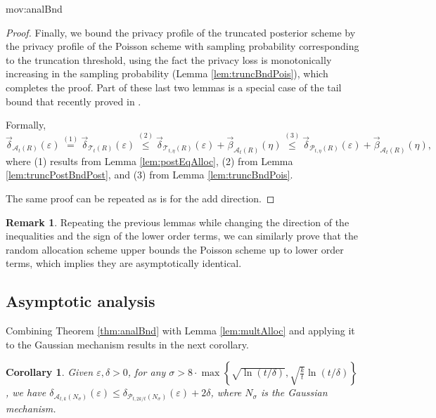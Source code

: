 \documentclass{article}
\newcommand{\arxvFtnt}[1]{}
\newcommand{\mainThmAsym}{thm:analBnd}
\newcommand{\arxvFtnt}[1]{\footnote{#1}}
\newcommand{\mainThmAsym}{thm:asymBnd}
\theoremstyle{plain}
\newtheorem{corollary}[theorem]{Corollary}
\theoremstyle{definition}
\newtheorem{remark}[theorem]{Remark}
\newcommand{\eps}{\varepsilon}
\newcommand{\eqExp}[2]{\overset{(#1)}{#2}}
\newcommand{\rand}{R}
\newcommand{\Pois}[2]{\mathcal{P}_{#1}\left(#2\right)}
\newcommand{\alloc}[2]{\mathcal{A}_{#1}\left(#2\right)}
\newcommand{\post}[2]{\mathcal{T}_{#1}\left(#2\right)}
\newcommand{\rem}[1]{\vec{#1}}
\newcommand{\privProf}[1]{\delta_{#1}}
\newcommand{\privProfRem}[1]{\rem{\delta}_{#1}}
\begin{document}
\begin{movable}{mov:analBnd}{}
\begin{proof}
    Finally, we bound the privacy profile of the truncated posterior scheme by the privacy profile of the Poisson scheme with sampling probability corresponding to the truncation threshold, using the fact the privacy loss is monotonically increasing in the sampling probability (Lemma \ref{lem:truncBndPois}), which completes the proof. Part of these last two lemmas is a special case of the tail bound that recently proved in \citep[Theorem 3.1]{CCGST23}.

    Formally,
    \[
        \privProfRem{\alloc{t}{\rand}}(\eps) \eqExp{1}{=} \privProfRem{\post{t}{\rand}}(\eps) \eqExp{2}{\le} \privProfRem{\post{t, \eta}{\rand}}(\eps) + \rem{\beta}_{\alloc{t}{\rand}}(\eta) \eqExp{3}{\le} \privProfRem{\Pois{t, \eta}{\rand}}(\eps) + \rem{\beta}_{\alloc{t}{\rand}}(\eta),
    \]
	where (1) results from Lemma \ref{lem:postEqAlloc}, (2) from Lemma \ref{lem:truncPostBndPost}, and (3) from Lemma \ref{lem:truncBndPois}.

    The same proof can be repeated as is for the add direction. 
\end{proof}

\begin{remark}
    Repeating the previous lemmas while changing the direction of the inequalities and the sign of the lower order terms, we can similarly prove that the random allocation scheme upper bounds the Poisson scheme up to lower order terms, which implies they are asymptotically identical.
\end{remark}    
\end{movable}

\subsection{ Asymptotic analysis}\label{sec:asym}
Combining Theorem \ref{\mainThmAsym} with Lemma \ref{lem:multAlloc} and applying it to the Gaussian mechanism results in the next corollary.\arxvFtnt{Extending Lemma \ref{lem:analBnd} and Theorem \ref{thm:asymBnd} to directly account for allocation of $k$ steps might improve some lower order terms, but requires a more involved version of Lemma \ref{lem:truncPostBndPost}, specifically Claim \ref{clm:postProbEqLoss} on which its proof relies. We leave this for future work.}

\begin{corollary} \label{cor:GaussAnalBnd}
    Given $\eps, \delta > 0$, for any $\sigma > 8 \cdot \max \left\{\sqrt{\ln(t/\delta)}, \sqrt{\frac{k}{t}} \ln(t/\delta) \right\}$, we have $\privProf{\alloc{t, k}{N_{\sigma}}}(\eps) \le \privProf{\Pois{t, 2 k / t}{N_{\sigma}}}(\eps) + 2 \delta$, where $N_{\sigma}$ is the Gaussian mechanism.
\end{corollary}
\end{document}

